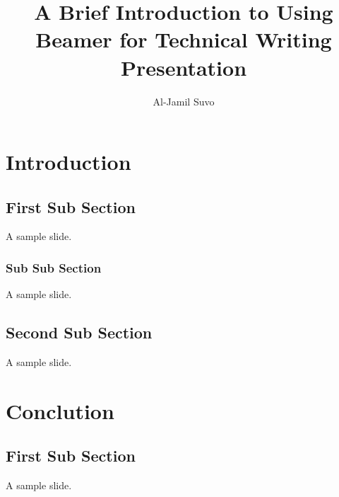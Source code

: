 \documentclass{beamer}
\title[Intro to Beamer]{A Brief Introduction to Using Beamer for Technical Writing Presentation}
\author[Al-Jamil Suvo]{Al-Jamil Suvo}
\institute[BUET]{Bangladesh University of Engineering and Technology}
\begin{document}
\begin{frame}
\titlepage
\end{frame}
\section{Introduction}
\subsection{First Sub Section}
\begin{frame}
A sample slide.
\end{frame}
\subsubsection{Sub Sub Section}
\begin{frame}
A sample slide.
\end{frame}

\subsection{Second Sub Section}
\begin{frame}
A sample slide.
\end{frame}
\section{Conclution}
\subsection{First Sub Section}
\begin{frame}
A sample slide.
\end{frame}
\end{document}
